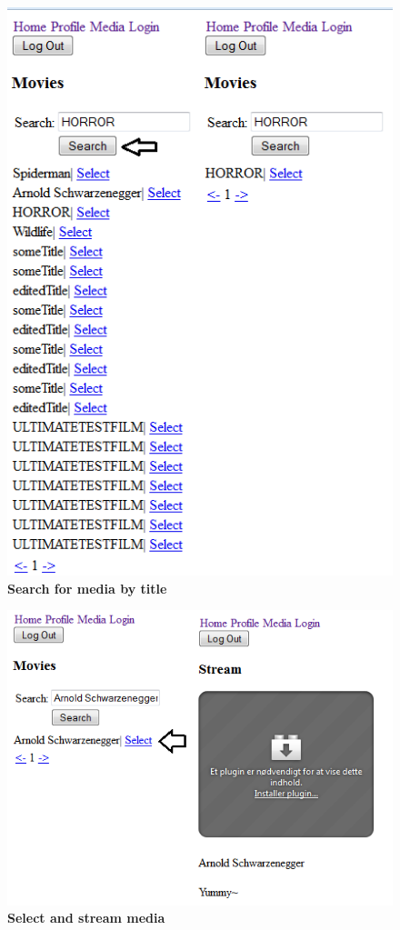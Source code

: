\documentclass[11pt]{article}
\begin{document}
\begin{figure}[H]
  \caption{\textbf{Search for media by title}}
  \centering
    \includegraphics[width=1\textwidth]{images/UM_search_media.png}
\end{figure}

\begin{figure}[H]
  \caption{\textbf{Select and stream media}}
  \centering
    \includegraphics[width=1\textwidth]{images/UM_select_stream_media.png}
\end{figure}
\end{document}
